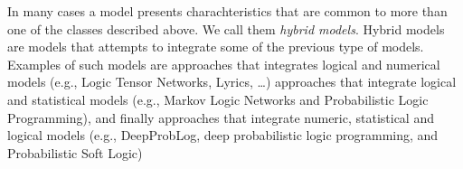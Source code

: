 In many cases a model presents charachteristics that are common to
more than one of the classes described above. We call them \emph{hybrid
  models}. Hybrid models are models that attempts to integrate some of
the previous type of models. Examples of such models are approaches
that integrates logical and numerical models (e.g., Logic Tensor
Networks, Lyrics, \dots) approaches that integrate logical and
statistical models (e.g., Markov Logic Networks and Probabilistic
Logic Programming), and finally approaches that integrate numeric,
statistical and logical models (e.g., DeepProbLog, deep probabilistic
logic programming, and Probabilistic Soft Logic)

